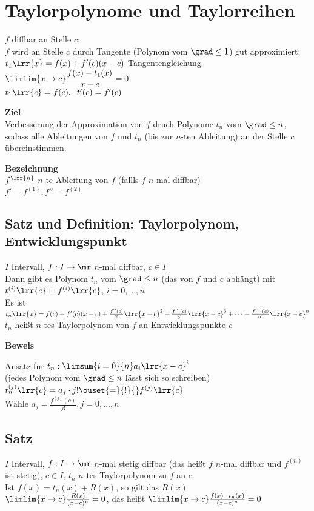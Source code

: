 \newpage
\section{Taylorpolynome und Taylorreihen}
	$f$ diffbar an Stelle $c$:\\
	$f$ wird an Stelle $c$ durch Tangente (Polynom vom $\grad\leq 1$) gut approximiert:\\
	$t_1\lrr{x}=f(x)+f'(c)(x-c)$ Tangentengleichung\\
	$\limlim{x\rightarrow c}\dfrac{f(x)-t_1(x)}{x-c}=0$\\
	$t_1\lrr{c}=f(c),\;\; t'(c)=f'(c)$
	
	\textbf{Ziel}\\
	Verbesserung der Approximation von $f$ druch Polynome $t_n$ vom $\grad\leq n$, sodass alle Ableitungen von $f$ und $t_n$ (bis zur $n$-ten Ableitung) an der Stelle $c$ übereinstimmen.
	
	\textbf{Bezeichnung}\\
	$f^{\lrr{n}}$ $n$-te Ableitung von $f$ (fallls $f$ $n$-mal diffbar)\\
	$f'=f^{(1)}, f''=f^(2)$
	
\subsection{Satz und Definition: Taylorpolynom, Entwicklungspunkt}
	$I$ Intervall, $f:I\rightarrow\mr$ $n$-mal diffbar, $c\in I$\\
	Dann gibt es Polynom $t_n$ vom $\grad\leq n$ (das von $f$ und $c$ abhängt) mit $t^{(i)}\lrr{c}=f^{(i)}\lrr{c}$, $i=0,\dots, n$\\
	Es ist $t_n\lrr{x}=f(c)+f'(c)(x-c)+\frac{f''(c)}{2}\lrr{x-c}^2+\frac{f'''(c)}{3!}\lrr{x-c}^3+\dots+\frac{f^{(n)}(c)}{n!}\lrr{x-c}^n$\\
	$t_n$ heißt $n$-tes Taylorpolynom von $f$ an Entwicklungspunkte $c$
	
	\textbf{Beweis}
	
	Ansatz für $t_n:\limsum{i=0}{n}a_i\lrr{x-c}^i$\\
	(jedes Polynom vom $\grad\leq n$ lässt sich so schreiben)\\
	$t_n^{(j)}\lrr{c}=a_j\cdot j!\ouset{=}{!}{} f^{(j)}\lrr{c}$\\
	Wähle $a_j=\frac{f^{(j)}(c)}{j!}, j=0,\dots, n$
	
\subsection{Satz}
	$I$ Intervall, $f:I\rightarrow\mr$ $n$-mal stetig diffbar (das heißt $f$ $n$-mal diffbar und $f^{(n)}$ ist stetig), $c\in I$, $t_n$ $n$-tes Taylorpolynom zu $f$ an $c$.\\
	Ist $f(x)=t_n(x)+R(x)$, so gilt das  $R(x)$\\
	$\limlim{x\rightarrow c}\frac{R(x)}{(x-c)^n}=0$, das heißt $\limlim{x\rightarrow c}\frac{f(x)-t_n(x)}{(x-c)^n}=0$
	

